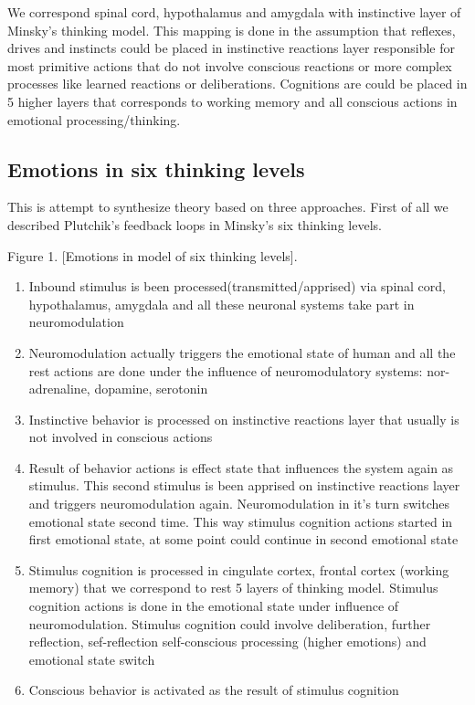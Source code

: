 We correspond spinal cord, hypothalamus and amygdala with instinctive layer of Minsky's thinking model. This mapping is done in the assumption that reflexes, drives and instincts could be placed in instinctive reactions layer responsible for most primitive actions that do not involve conscious reactions or more complex processes like learned reactions or deliberations. Cognitions are could be placed in 5 higher layers that corresponds to working memory and all conscious actions in emotional processing/thinking.

\subsection{Emotions in six thinking levels}

This is attempt to synthesize theory based on three approaches. First of all we described Plutchik's feedback loops\cite{natureofemotions} in Minsky's six thinking levels.



Figure 1. [Emotions in model of six thinking levels].

\begin{enumerate}
\item  Inbound stimulus is been processed(transmitted/apprised) via spinal cord, hypothalamus, amygdala and all these neuronal systems take part in neuromodulation
\item  Neuromodulation actually triggers the emotional state of human and all the rest actions are done under the influence of neuromodulatory systems: nor-adrenaline, dopamine, serotonin
\item  Instinctive behavior is processed on instinctive reactions layer that usually is not involved in conscious actions
\item  Result of behavior actions is effect state that influences the system again as stimulus. This second stimulus is been apprised on instinctive reactions layer and triggers neuromodulation again. Neuromodulation in it's turn switches emotional state second time. This way stimulus cognition actions started in first emotional state, at some point could continue in second emotional state
\item  Stimulus cognition is processed in cingulate cortex, frontal cortex (working memory) that we correspond to rest 5 layers of thinking model. Stimulus cognition actions is done in the emotional state under influence of neuromodulation. Stimulus cognition could involve deliberation, further reflection, sef-reflection self-conscious processing (higher emotions) and  emotional state switch
\item  Conscious behavior is activated as the result of stimulus cognition
\end{enumerate}

